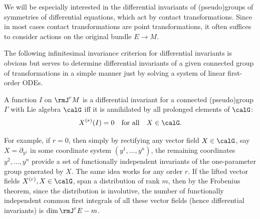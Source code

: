We will be especially interested in the differential invariants of (pseudo)groups of symmetries of differential equations, which act by contact transformations. Since in most cases contact transformations are point transformations, it often suffices to consider actions on the original bundle $E\to M$.

The following infinitesimal invariance criterion for differential invariants is obvious but serves to determine differential invariants of a given connected group of transformations in a simple manner just by solving a system of linear first-order ODEs.

\begin{prop}
    A function $I$ on $\rmJ^r M$ is a differential invariant for a connected (pseudo)group $\Gamma$ with Lie algebra $\calG$ iff it is annihilated by all prolonged elements of $\calG$:
    \[X^{(r)}(I)=0\quad \text{for all}\quad X\in\calG.\]
\end{prop}

For example, if $r=0$, then simply by rectifying any vector field $X\in\calG$, say $X=\partial_{y^1}$ in some coordinate system $(y^1,\ldots,y^n)$, the remaining coordinates $y^2,\ldots,y^n$ provide a set of functionally independent invariants of the one-parameter group generated by $X$. The same idea works for any order $r$. If the lifted vector fields $X^{(r)},X\in\calG$, span a distribution of rank $m$, then by the Frobenius theorem, since the distribution is involutive, the number of functionally independent common first integrals of all these vector fields (hence differential invariants) is $\dim \rmJ^r E-m$.


